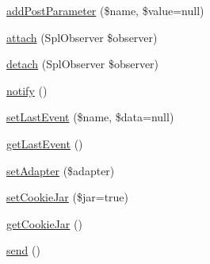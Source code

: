 \begin{DoxyCompactItemize}
\hyperlink{classHTTP__Request2_a45a950fb625fe85fedd123fc95cff92d}{add\-Post\-Parameter} (\$name, \$value=null)
\item 
\hyperlink{classHTTP__Request2_a91ff31f582d0156df454685e60b72e1c}{attach} (Spl\-Observer \$observer)
\item 
\hyperlink{classHTTP__Request2_a43da613f3526bfe033f5fafd58f9c50c}{detach} (Spl\-Observer \$observer)
\item 
\hyperlink{classHTTP__Request2_af35a8a6eb99219760dddd6223599a8ef}{notify} ()
\item 
\hyperlink{classHTTP__Request2_a1c05aea3c3857ad8f4c6a0a9eb33911d}{set\-Last\-Event} (\$name, \$data=null)
\item 
\hyperlink{classHTTP__Request2_afe70adf8c72a426f80ce66b4170e0f61}{get\-Last\-Event} ()
\item 
\hyperlink{classHTTP__Request2_a27fadfa673c3317675ab78b5df99264a}{set\-Adapter} (\$adapter)
\item 
\hyperlink{classHTTP__Request2_a396fdfdb92d2cb5dce1c8230919eb5d4}{set\-Cookie\-Jar} (\$jar=true)
\item 
\hyperlink{classHTTP__Request2_ad56d5f45235cb4f753d1ee9c7cd4c0e0}{get\-Cookie\-Jar} ()
\item 
\hyperlink{classHTTP__Request2_a0c8dee043682c61c0f1dc1558ea64d36}{send} ()
\end{DoxyCompactItemize}
